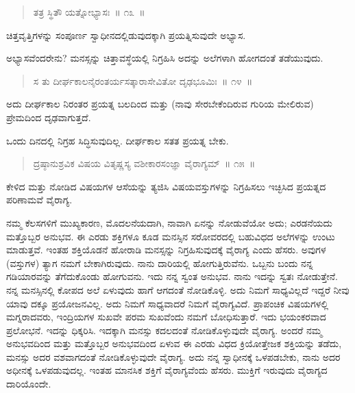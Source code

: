\vspace{-0.2cm}

\begin{verse}
ತತ್ರ ಸ್ಥಿತೌ ಯತ್ನೋಭ್ಯಾಸಃ~॥ ೧೩~॥
\end{verse}

\vspace{-0.2cm}

ಚಿತ್ತವೃತ್ತಿಗಳನ್ನು ಸಂಪೂರ್ಣ ಸ್ವಾಧೀನದಲ್ಲಿಡುವುದಕ್ಕಾಗಿ ಪ್ರಯತ್ನಿಸುವುದೇ ಅಭ್ಯಾಸ. 

ಅಭ್ಯಾಸವೆಂದರೇನು? ಮನಸ್ಸನ್ನು ಚಿತ್ತಾವಸ್ಥೆಯಲ್ಲಿ ನಿಗ್ರಹಿಸಿ ಅದನ್ನು ಅಲೆಗಳಾಗಿ ಹೋಗದಂತೆ ತಡೆಯುವುದು. 

\vspace{-0.2cm}

\begin{verse}
ಸ ತು ದೀರ್ಘಕಾಲನೈರಂತರ್ಯಸತ್ಕಾರಾಸೇವಿತೋ ದೃಢಭೂಮಿಃ~॥ ೧೪~॥
\end{verse}

\vspace{-0.2cm}

ಅದು ದೀರ್ಘಕಾಲ ನಿರಂತರ ಪ್ರಯತ್ನ ಬಲದಿಂದ ಮತ್ತು (ನಾವು ಸೇರಬೇಕೆಂದಿರುವ ಗುರಿಯ ಮೇಲಿರುವ) ಪ್ರೇಮದಿಂದ  ದೃಢವಾಗುತ್ತದೆ. 

ಒಂದು ದಿನದಲ್ಲಿ ನಿಗ್ರಹ ಸಿದ್ಧಿಸುವುದಿಲ್ಲ. ದೀರ್ಘಕಾಲ ಸತತ ಪ್ರಯತ್ನ ಬೇಕು. 

\vspace{-0.2cm}

\begin{verse}
ದ್ರಷ್ಠಾನುಶ್ರವಿಕ ವಿಷಯ ವಿತೃಷ್ಣಸ್ಯ ವಶೀಕಾರಸಂಜ್ಞಾ ವೈರಾಗ್ಯಮ್​~॥ ೧೫~॥
\end{verse}

\vspace{-0.2cm}

ಕೇಳಿದ ಮತ್ತು ನೋಡಿದ ವಿಷಯಗಳ ಆಸೆಯನ್ನು ತ್ಯಜಿಸಿ ವಿಷಯವಸ್ತುಗಳನ್ನು ನಿಗ್ರಹಿಸಲು ಇಚ್ಛಿಸಿದ ಪ್ರಯತ್ನದ ಪರಿಣಾಮವೆ ವೈರಾಗ್ಯ. 

ನಮ್ಮ ಕೆಲಸಗಳಿಗೆ ಮುಖ್ಯಕಾರಣ, ಮೊದಲನೆಯದಾಗಿ, ನಾವಾಗಿ ಏನನ್ನು ನೋಡು\break ವೆಯೋ ಅದು; ಎರಡನೆಯದು ಮತ್ತೊಬ್ಬರ ಅನುಭವ. ಈ ಎರಡು ಶಕ್ತಿಗಳೂ ಕೂಡ ಮನಸ್ಸಿನ ಸರೋವರದಲ್ಲಿ ಬಹುವಿಧದ ಅಲೆಗಳನ್ನು ಉಂಟು ಮಾಡುತ್ತವೆ. ಇಂತಹ ಶಕ್ತಿಯೊಡನೆ ಹೋರಾಡಿ ಮನಸ್ಸನ್ನು ನಿಗ್ರಹಿಸುವುದಕ್ಕೆ ವೈರಾಗ್ಯ ಎಂದು ಹೆಸರು. ಅವುಗಳ (ವಸ್ತುಗಳ) ತ್ಯಾಗ ನಮಗೆ ಬೇಕಾಗಿರುವುದು. ನಾನು ದಾರಿಯಲ್ಲಿ ಹೋಗುತ್ತಿರುವೆನು. ಒಬ್ಬನು ಬಂದು ನನ್ನ ಗಡಿಯಾರವನ್ನು ತೆಗೆದುಕೊಂಡು ಹೋಗುವನು. ಇದು ನನ್ನ ಸ್ವಂತ ಅನುಭವ. ನಾನು ಇದನ್ನು ಸ್ವತಃ ನೋಡುತ್ತೇನೆ. ನನ್ನ ಮನಸ್ಸಿನಲ್ಲಿ ಕೋಪದ ಅಲೆ ಏಳುವುದು ಹಾಗೆ ಆಗದಂತೆ ನೋಡಿಕೊಳ್ಳಿ. ಅದು ನಿಮಗೆ ಸಾಧ್ಯವಿಲ್ಲದೆ ಇದ್ದರೆ ನೀವು ಯಾವು ದಕ್ಕೂ ಪ್ರಯೋಜನವಿಲ್ಲ. ಅದು ನಿಮಗೆ ಸಾಧ್ಯವಾದರೆ ನಿಮಗೆ ವೈರಾಗ್ಯವಿದೆ. ಪ್ರಾಪಂಚಿಕ ವಿಷಯಗಳಲ್ಲಿ ಮಗ್ನರಾದವರು, ಇಂದ್ರಿಯಗಳ ಸುಖವೇ ಪರಮ ಸುಖವೆಂದು ನಮಗೆ ಬೋಧಿಸುತ್ತಾರೆ. ಇದು ಭಯಂಕರವಾದ ಪ್ರಲೋಭನೆ. ಇದನ್ನು ಧಿಕ್ಕರಿಸಿ. ಇದಕ್ಕಾಗಿ ಮನಸ್ಸು ಕದಲದಂತೆ ನೋಡಿಕೊಳ್ಳುವುದೇ ವೈರಾಗ್ಯ. ಅಂದರೆ ನಮ್ಮ ಅನುಭವದಿಂದ ಮತ್ತು ಮತ್ತೊಬ್ಬರ ಅನುಭವದಿಂದ ಏಳುವ ಈ ಎರಡು ವಿಧದ ಕ್ರಿಯೋತ್ತೇಜಕ ಶಕ್ತಿಯನ್ನು ತಡೆದು, ಮನಸ್ಸು ಅದರ ವಶವಾಗದಂತೆ ನೋಡಿಕೊಳ್ಳುವುದೇ ವೈರಾಗ್ಯ. ಅದು ನನ್ನ ಸ್ವಾಧೀನಕ್ಕೆ ಒಳಪಡಬೇಕು, ನಾನು ಅದರ ಅಧೀನಕ್ಕೆ ಒಳಪಡುವುದಲ್ಲ. ಇಂತಹ ಮಾನಸಿಕ ಶಕ್ತಿಗೆ ವೈರಾಗ್ಯವೆಂದು ಹೆಸರು. ಮುಕ್ತಿಗೆ ಇರುವುದು ವೈರಾಗ್ಯದ ದಾರಿಯೊಂದೇ. 

